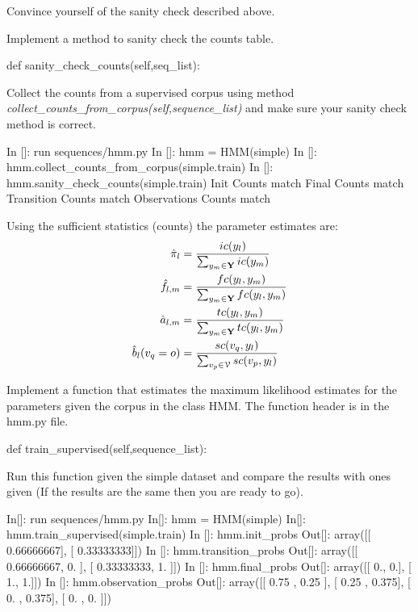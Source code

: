 \begin{exercise}
Convince yourself of the sanity check described above.

Implement a method to sanity check the counts table. 
\begin{python}
 def sanity_check_counts(self,seq_list):
\end{python}

Collect the counts from a supervised corpus using method
\emph{collect\_counts\_from\_corpus(self,sequence\_list)} and make sure
your sanity check method is correct.

\begin{python}
In []: run sequences/hmm.py
In []: hmm = HMM(simple)
In []: hmm.collect_counts_from_corpus(simple.train)
In []: hmm.sanity_check_counts(simple.train)
Init Counts match
Final Counts match
Transition Counts match
Observations Counts match
\end{python}
\end{exercise}


Using the sufficient statistics (counts) the parameter estimates are: 
\begin{align}
  \hat{\pi}_l &=  \frac{ic({y}_l)}{\sum_{{y}_m \in \mathbf{Y}}
    ic({y}_m)}\\
  \hat{f}_{l,m} &= \frac{fc({y}_l,{y}_m)}{\sum_{{y}_m \in \mathbf{Y}} fc({y}_l,{y}_m)} \\
  \hat{a}_{l,m} &= \frac{tc({y}_l,{y}_m)}{\sum_{{y}_m \in \mathbf{Y}} tc({y}_l,{y}_m)} \\
  \hat{b}_l({v}_q = o) &= \frac{sc({v}_q,{y}_l)}{\sum_{{v}_p \in\mathcal{V}} sc({v}_p,{y}_l)}
\end{align}


\begin{exercise}
Implement a function that estimates the maximum likelihood
estimates for the parameters given the corpus in the class HMM.
The function header is in the hmm.py file. 
\begin{python}
def train_supervised(self,sequence_list):
\end{python}
Run this function given the simple dataset and compare the results
with ones given (If the results are the same then you are ready to go).
\begin{python}
In[]:  run sequences/hmm.py
In[]: hmm = HMM(simple)
In[]: hmm.train_supervised(simple.train)
In []: hmm.init_probs
Out[]: 
array([[ 0.66666667],
       [ 0.33333333]])
In []: hmm.transition_probs
Out[]: 
array([[ 0.66666667,  0.        ],
       [ 0.33333333,  1.        ]])
In []: hmm.final_probs
Out[]: 
array([[ 0.,  0.],
       [ 1.,  1.]])
In []: hmm.observation_probs
Out[]: 
array([[ 0.75 ,  0.25 ],
       [ 0.25 ,  0.375],
       [ 0.   ,  0.375],
       [ 0.   ,  0.   ]])
\end{python}
\end{exercise}


